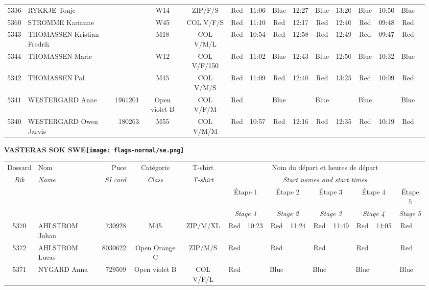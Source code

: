 \documentclass{report}
\begin{document}
\begin{longtable}{|c|l|r|c|c|*{5}{cc|}}
    5336 & RYKKJE Tonje &  & W14 & ZIP/F/S & Red & 11:06 & Blue & 12:27 & Blue & 13:20 & Blue & 10:50 & Blue &  \\
    5360 & STROMME Karianne &  & W45 & COL V/F/S & Red & 11:10 & Red & 12:17 & Red & 12:40 & Red & 09:48 & Red &  \\
    5343 & THOMASSEN Kristian Fredrik &  & M18 & COL V/M/L & Red & 10:54 & Red & 12:58 & Red & 12:49 & Red & 09:47 & Red &  \\
    5344 & THOMASSEN Marie &  & W12 & COL V/F/150 & Red & 11:02 & Blue & 12:43 & Blue & 12:50 & Blue & 10:32 & Blue &  \\
    5342 & THOMASSEN Pal &  & M45 & COL V/M/S & Red & 11:09 & Red & 12:40 & Red & 13:25 & Red & 10:09 & Red &  \\
    5341 & WESTERGARD Anne & 1961201 & Open violet B & COL V/F/M & Red &   & Blue &   & Blue &   & Blue &   & Blue &  \\
    5340 & WESTERGARD Owen Jarvis & 180263 & M55 & COL V/M/M & Red & 10:57 & Red & 12:16 & Red & 12:35 & Red & 10:19 & Red &  \\
  \end{longtable}
\newpage
  \Huge \centering \bfseries VASTERAS SOK  SWE\normalfont \footnotesize \sffamily \hfill \texttt{[image: flags-normal/se.png]} \newline 
  \begin{longtable}{|c|l|r|c|c|*{5}{cc|}}
    Dossard & Nom  & Puce    & Catégorie & T-shirt & \multicolumn{10}{c|}{Nom du départ et heures de départ} \\
    \itshape Bib     & \itshape Name & \itshape SI card & \itshape Class  & \itshape  T-shirt  & \multicolumn{10}{c|}{\itshape Start names and start times} \\
    \hline
    & & & & & \multicolumn{2}{c|}{Étape 1} & \multicolumn{2}{c|}{Étape 2} & \multicolumn{2}{c|}{Étape 3} & \multicolumn{2}{c|}{Étape 4} & \multicolumn{2}{c|}{Étape 5} \\
    & & & & & \multicolumn{2}{c|}{\itshape Stage 1} & \multicolumn{2}{c|}{\itshape Stage 2} & \multicolumn{2}{c|}{\itshape Stage 3} & \multicolumn{2}{c|}{\itshape Stage 4} & \multicolumn{2}{c|}{\itshape Stage 5} \\
    \hline
    5370 & AHLSTROM Johan & 730928 & M45 & ZIP/M/XL & Red & 10:23 & Red & 11:24 & Red & 11:49 & Red & 14:05 & Red &  \\
    5372 & AHLSTROM Lucas & 8030622 & Open Orange C & ZIP/M/S & Red &   & Red &   & Red &   & Red &   & Red &  \\
    5371 & NYGARD Anna & 729509 & Open violet B & COL V/F/L & Red &   & Blue &   & Blue &   & Blue &   & Blue &  \\
  \end{longtable}
\end{document}
